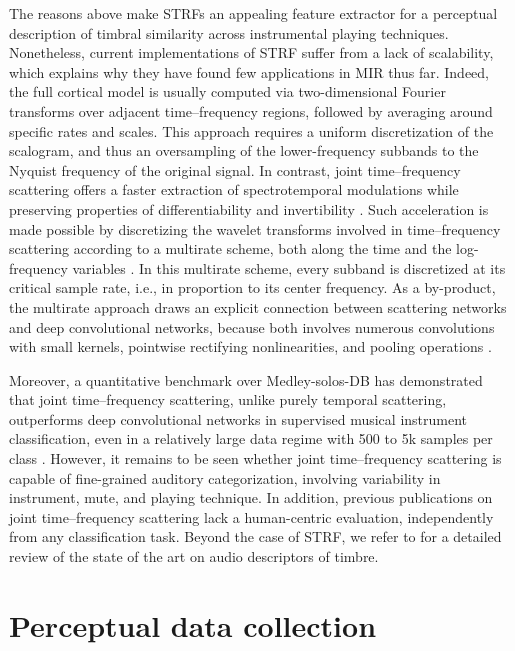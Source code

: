 \documentclass{bmcart}
\newcommand{\ja}[1]{\textcolor{purple}{JA: #1}\xspace}
\newcommand{\nmu}{}
\begin{document}
The reasons above make STRFs an appealing feature extractor for a perceptual description of timbral similarity across instrumental playing techniques.
Nonetheless, current implementations of STRF suffer from a lack of scalability, which explains why they have found few applications in MIR thus far.
Indeed, the full cortical model is usually computed via two-dimensional Fourier transforms over adjacent time--frequency regions, followed by averaging around specific rates and scales.
This approach requires a uniform discretization of the scalogram, and thus an oversampling of the lower-frequency subbands to the Nyquist frequency of the original signal.
In contrast, joint time--frequency scattering offers a faster extraction of spectrotemporal modulations while preserving properties of differentiability \cite{andreux2020jmlr} and invertibility \cite{lostanlen2019dafx}.
Such acceleration is made possible by discretizing the wavelet transforms involved in time--frequency scattering according to a multirate scheme, both along the time and the log-frequency variables \cite{anden2019tsp}.
In this multirate scheme, every subband is discretized at its critical sample rate, i.e., in proportion to its center frequency.
As a by-product, the multirate approach draws an explicit connection between scattering networks and deep convolutional networks, because both involves numerous convolutions with small kernels, pointwise rectifying nonlinearities, and pooling operations \cite{mallat2016philtrans}.

Moreover, a quantitative benchmark over Medley-solos-DB has demonstrated that joint time--frequency scattering, unlike purely temporal scattering, outperforms deep convolutional networks in supervised musical instrument classification, even in a relatively large data regime with 500 to 5k samples per class \cite{anden2019tsp}. %
However, it remains to be seen whether joint time--frequency scattering is capable of fine-grained auditory categorization, involving variability in instrument, mute, and playing technique.
In addition, previous publications on joint time--frequency scattering lack a human-centric evaluation, independently from any classification task.
Beyond the case of STRF, we refer to \cite{caetano2019chapter} for a detailed review of the state of the art on audio descriptors of timbre.


\section*{\nmu Perceptual data collection}
\label{sec:data-collection}
\end{document}
